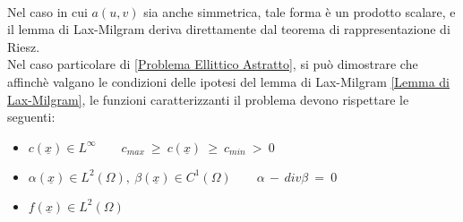 \documentclass[12pt,a4paper]{report}
\theoremstyle{theorem}
\theoremstyle{theorem}
\theoremstyle{definition}
\begin{document}
\hfill \\
Nel caso in cui $a(u,v)$ sia anche simmetrica, tale forma è un prodotto scalare, e il lemma di Lax-Milgram deriva direttamente dal teorema di rappresentazione di Riesz. \\
Nel caso particolare di \ref{Problema Ellittico Astratto}, si può dimostrare che affinchè valgano le condizioni delle ipotesi del lemma di Lax-Milgram \ref{Lemma di Lax-Milgram}, le funzioni caratterizzanti il problema devono rispettare le seguenti:
\begin{itemize}
	\item $c(\underline{x}) \in L^{\infty} \qquad c_{max} \ \geq \ c(\underline{x}) \ \geq \ c_{min} \ > \ 0 $
	\item $\alpha(\underline{x}) \in L^{2}(\Omega), \ \beta(\underline{x}) \in C^{1}(\Omega) \qquad \alpha \, - \, div \beta \ = \ 0$
	\item $f(\underline{x}) \in L^{2}(\Omega)$
\end{itemize}
\end{document}
